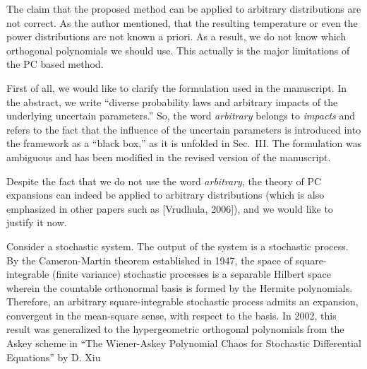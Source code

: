 \begin{reviewer}
[Comment 5] The claim that the proposed method can be applied to arbitrary distributions are not correct. As the author mentioned, that the resulting temperature or even the power distributions are not known a priori. As a result, we do not know which orthogonal polynomials we should use. This actually is the major limitations of the PC based method.
\end{reviewer}
\begin{authors}
First of all, we would like to clarify the formulation used in the manuscript.
In the abstract, we write ``diverse probability laws and arbitrary impacts of the underlying uncertain parameters.''
So, the word \emph{arbitrary} belongs to \emph{impacts} and refers to the fact that the influence of the uncertain parameters is introduced into the framework as a ``black box,'' as it is unfolded in Sec.~III.
The formulation was ambiguous and has been modified in the revised version of the manuscript.

Despite the fact that we do not use the word \emph{arbitrary}, the theory of PC expansions can indeed be applied to arbitrary distributions (which is also emphasized in other papers such as [Vrudhula, 2006]), and we would like to justify it now.

Consider a stochastic system.
The output of the system is a stochastic process.
By the Cameron-Martin theorem established in 1947, the space of square-integrable (finite variance) stochastic processes is a separable Hilbert space wherein the countable orthonormal basis is formed by the Hermite polynomials.
Therefore, an arbitrary square-integrable stochastic process admits an expansion, convergent in the mean-square sense, with respect to the basis.
In 2002, this result was generalized to the hypergeometric orthogonal polynomials from the Askey scheme in ``The Wiener-Askey Polynomial Chaos for Stochastic Differential Equations'' by D. Xiu \etal


\end{authors}
